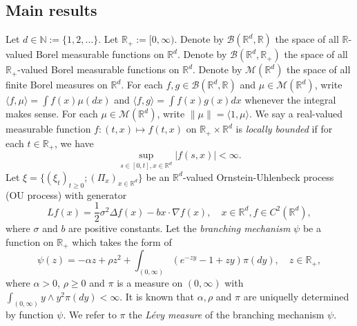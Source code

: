 \documentclass[12pt,a4paper]{amsart}
\theoremstyle{plain}
\theoremstyle{definition}
\numberwithin{equation}{section}
\begin{document}
\subsection{Main results}
\label{sec: main results}{}
	Let $d \in \mathbb N:= \{1,2,\dots\}$.
    Let $\mathbb R_+:= [0,\infty)$.
    Denote by $\mathcal B(\mathbb R^d, \mathbb R)$ the space of all $\mathbb R$-valued Borel measurable functions on $\mathbb R^d$.
    Denote by $\mathcal B(\mathbb R^d, \mathbb R_+)$ the space of all $\mathbb R_+$-valued Borel measurable functions on $\mathbb R^d$.
    Denote by $\mathcal M(\mathbb R^d)$ the space of all finite Borel measures on $\mathbb R^d$.
    For each $f,g\in \mathcal B(\mathbb R^d, \mathbb R)$ and $\mu \in \mathcal M(\mathbb R^d)$, write $\langle f,\mu\rangle = \int f(x)\mu(dx)$ and $\langle f, g\rangle = \int f(x)g(x) dx$ whenever the integral makes sense.
    For each $\mu \in \mathcal M(\mathbb R^d)$, write $\|\mu\| = \langle 1, \mu\rangle$.
    We say a real-valued measurable function $f:(t,x)\mapsto f(t,x)$ on $\mathbb R_+\times \mathbb R^d$ is \emph{locally bounded} if for each $t\in \mathbb R_+$, we have 
\[
    \sup_{s\in [0,t],x\in \mathbb R^d} |f(s,x)|<\infty.
\]
    Let $\xi=\{(\xi_t)_{t\geq 0}; (\Pi_x)_{x\in \mathbb R^d}\}$ be an $\mathbb R^d$-valued Ornstein-Uhlenbeck process (OU process) with generator
\begin{equation}
    Lf(x)
    = \frac{1}{2}\sigma^2\Delta f(x)-b x \cdot \nabla f(x),
    \quad  x\in \mathbb R^d, f \in C^2(\mathbb R^d),
\end{equation}
    where $\sigma$ and $b$ are positive constants.
    Let the \emph{branching mechanism} $\psi$ be a function on $\mathbb R_+$ which takes the form of
\begin{equation} \label{eq: honogeneou branching mechanism}
    \psi(z)=
    - \alpha z + \rho z^2 + \int_{(0,\infty)} (e^{-zy} - 1 + zy) \pi(dy),
    \quad  z \in \mathbb R_+,
\end{equation}
	where $\alpha > 0 $, $\rho \geq0$ and $\pi$ is a measure on $(0,\infty)$ with $\int_{(0,\infty)}y\wedge y^2 \pi(dy)< \infty$.
	It is known that $\alpha, \rho$ and $\pi$ are uniquelly determined by function $\psi$. 
	We refer to $\pi$ the \emph{L\'evy measure} of the branching mechanism $\psi$.
\end{document}
